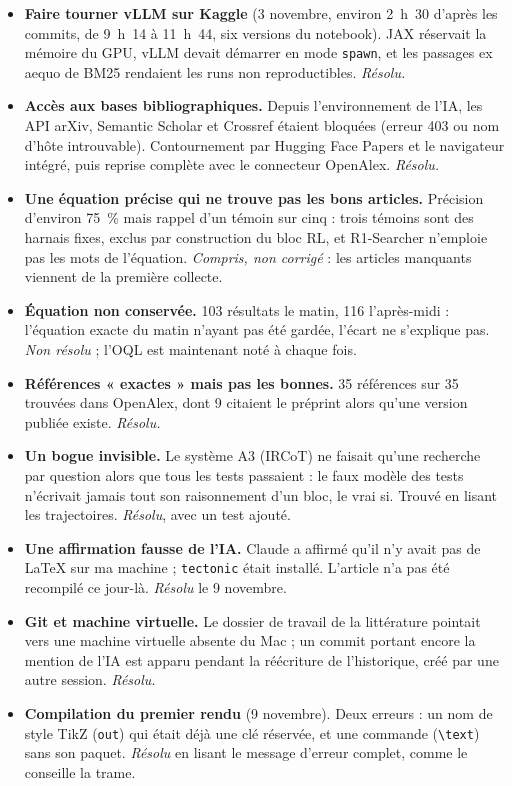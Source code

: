 \documentclass[10pt,a4paper]{article}
\newcommand{\f}[1]{\texttt{\small #1}}
\begin{document}
\begin{itemize}
\item \textbf{Faire tourner vLLM sur Kaggle} (3 novembre, environ 2~h~30 d'après les commits, de 9~h~14 à 11~h~44, six versions du notebook). JAX réservait la mémoire du GPU, vLLM devait démarrer en mode \f{spawn}, et les passages ex aequo de BM25 rendaient les runs non reproductibles. \emph{Résolu.}
\item \textbf{Accès aux bases bibliographiques.} Depuis l'environnement de l'IA, les API arXiv, Semantic Scholar et Crossref étaient bloquées (erreur 403 ou nom d'hôte introuvable). Contournement par Hugging Face Papers et le navigateur intégré, puis reprise complète avec le connecteur OpenAlex. \emph{Résolu.}
\item \textbf{Une équation précise qui ne trouve pas les bons articles.} Précision d'environ 75~\% mais rappel d'un témoin sur cinq : trois témoins sont des harnais fixes, exclus par construction du bloc RL, et R1-Searcher n'emploie pas les mots de l'équation. \emph{Compris, non corrigé} : les articles manquants viennent de la première collecte.
\item \textbf{Équation non conservée.} 103 résultats le matin, 116 l'après-midi : l'équation exacte du matin n'ayant pas été gardée, l'écart ne s'explique pas. \emph{Non résolu} ; l'OQL est maintenant noté à chaque fois.
\item \textbf{Références « exactes » mais pas les bonnes.} 35 références sur 35 trouvées dans OpenAlex, dont 9 citaient le préprint alors qu'une version publiée existe. \emph{Résolu.}
\item \textbf{Un bogue invisible.} Le système A3 (IRCoT) ne faisait qu'une recherche par question alors que tous les tests passaient : le faux modèle des tests n'écrivait jamais tout son raisonnement d'un bloc, le vrai si. Trouvé en lisant les trajectoires. \emph{Résolu}, avec un test ajouté.
\item \textbf{Une affirmation fausse de l'IA.} Claude a affirmé qu'il n'y avait pas de LaTeX sur ma machine ; \f{tectonic} était installé. L'article n'a pas été recompilé ce jour-là. \emph{Résolu} le 9 novembre.
\item \textbf{Git et machine virtuelle.} Le dossier de travail de la littérature pointait vers une machine virtuelle absente du Mac ; un commit portant encore la mention de l'IA est apparu pendant la réécriture de l'historique, créé par une autre session. \emph{Résolu.}
\item \textbf{Compilation du premier rendu} (9 novembre). Deux erreurs : un nom de style TikZ (\f{out}) qui était déjà une clé réservée, et une commande (\f{\textbackslash text}) sans son paquet. \emph{Résolu} en lisant le message d'erreur complet, comme le conseille la trame.

\end{itemize}
\end{document}

